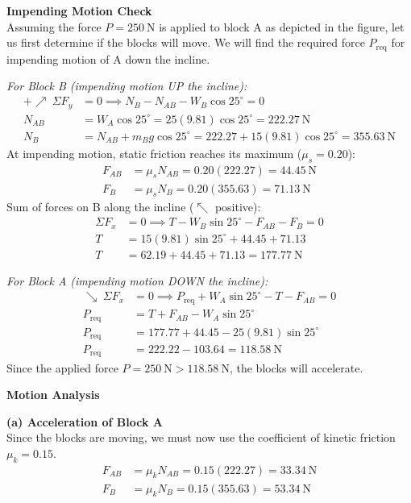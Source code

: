 \documentclass[12pt,a3paper]{article}
\begin{document}
\begin{enumerate}
\begin{tcolorbox}[enhanced,breakable,ansbox,colback=cG!4,colframe=cG,
  boxrule=0.8pt,arc=5pt,
  title={\textbf{Solution}},fonttitle=\bfseries\color{white},
  colbacktitle=cG]
\vspace{0.5cm}
\textbf{Impending Motion Check} \\
Assuming the force $P = 250\ \text{N}$ is applied to block A as depicted in the figure, let us first determine if the blocks will move. We will find the required force $P_{\text{req}}$ for impending motion of A down the incline.

\textit{For Block B (impending motion UP the incline):}
\begin{align*}
  +\!\nearrow\ \Sigma F_y &= 0 \implies N_B - N_{AB} - W_B\cos 25^\circ = 0 \\
  N_{AB} &= W_A \cos 25^\circ = 25(9.81)\cos 25^\circ = 222.27\ \text{N} \\
  N_B &= N_{AB} + m_B g\cos 25^\circ = 222.27 + 15(9.81)\cos 25^\circ = 355.63\ \text{N}
\end{align*}
At impending motion, static friction reaches its maximum ($\mu_s = 0.20$):
\begin{align*}
  F_{AB} &= \mu_s N_{AB} = 0.20(222.27) = 44.45\ \text{N} \\
  F_B &= \mu_s N_B = 0.20(355.63) = 71.13\ \text{N}
\end{align*}
Sum of forces on B along the incline ($\nwarrow$ positive):
\begin{align*}
  \Sigma F_x &= 0 \implies T - W_B\sin 25^\circ - F_{AB} - F_B = 0 \\
  T &= 15(9.81)\sin 25^\circ + 44.45 + 71.13 \\
  T &= 62.19 + 44.45 + 71.13 = 177.77\ \text{N}
\end{align*}

\textit{For Block A (impending motion DOWN the incline):}
\begin{align*}
  \searrow\ \Sigma F_x &= 0 \implies P_{\text{req}} + W_A\sin 25^\circ - T - F_{AB} = 0 \\
  P_{\text{req}} &= T + F_{AB} - W_A\sin 25^\circ \\
  P_{\text{req}} &= 177.77 + 44.45 - 25(9.81)\sin 25^\circ \\
  P_{\text{req}} &= 222.22 - 103.64 = 118.58\ \text{N}
\end{align*}
Since the applied force $P = 250\ \text{N} > 118.58\ \text{N}$, the blocks will accelerate.

\vspace{0.5cm}
\textbf{Motion Analysis}

\textbf{(a) Acceleration of Block A} \\
Since the blocks are moving, we must now use the coefficient of kinetic friction $\mu_k = 0.15$.
\begin{align*}
  F_{AB} &= \mu_k N_{AB} = 0.15(222.27) = 33.34\ \text{N} \\
  F_B &= \mu_k N_B = 0.15(355.63) = 53.34\ \text{N}
\end{align*}


\end{tcolorbox}
\end{enumerate}
\end{document}
